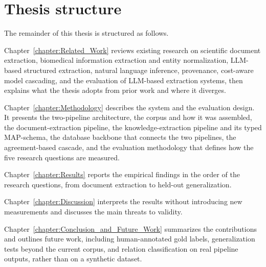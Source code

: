 \section{Thesis structure}\label{section:intro-thesis-structure}

The remainder of this thesis is structured as follows. 

Chapter~\ref{chapter:Related_Work} reviews existing research on scientific document extraction, biomedical information extraction and entity normalization, LLM-based structured extraction, natural language inference, provenance, cost-aware model cascading, and the evaluation of LLM-based extraction systems, then explains what the thesis adopts from prior work and where it diverges.

Chapter~\ref{chapter:Methodology} describes the system and the evaluation design. It presents the two-pipeline architecture, the corpus and how it was assembled, the document-extraction pipeline, the knowledge-extraction pipeline and its typed MAP-schema, the database backbone that connects the two pipelines, the agreement-based cascade, and the evaluation methodology that defines how the five research questions are measured. 

Chapter~\ref{chapter:Results} reports the empirical findings in the order of the research questions, from document extraction to held-out generalization.

Chapter~\ref{chapter:Discussion} interprets the results without introducing new measurements and discusses the main threats to validity. 

Chapter~\ref{chapter:Conclusion_and_Future_Work} summarizes the contributions and outlines future work, including human-annotated gold labels, generalization tests beyond the current corpus, and relation classification on real pipeline outputs, rather than on a synthetic dataset. 